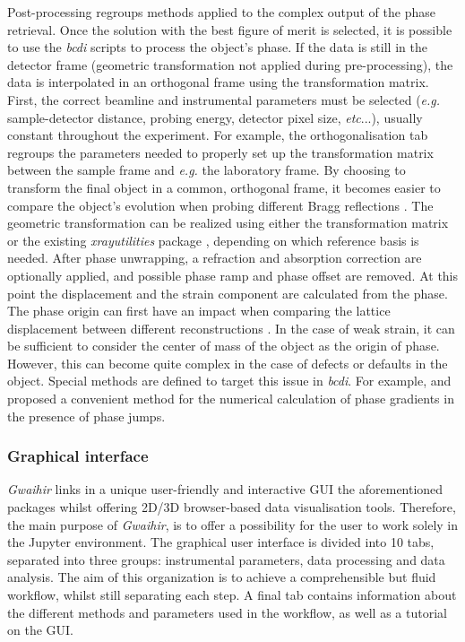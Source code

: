 Post-processing regroups methods applied to the complex output of the phase retrieval.
Once the solution with the best figure of merit is selected, it is possible to use the \textit{bcdi} scripts to process the object's phase.
If the data is still in the detector frame (geometric transformation not applied during pre-processing), the data is interpolated in an orthogonal frame using the transformation matrix.
First, the correct beamline and instrumental parameters must be selected (\textit{e.g.} sample-detector distance, probing energy, detector pixel size, \textit{etc}...), usually constant throughout the experiment.
For example, the orthogonalisation tab regroups the parameters needed to properly set up the transformation matrix between the sample frame and \textit{e.g.} the laboratory frame.
By choosing to transform the final object in a common, orthogonal frame, it becomes easier to compare the object's evolution when probing different Bragg reflections \parencite{crystal_sarah}.
The geometric transformation can be realized using either the transformation matrix \parencite{thesismark} or the existing  \textit{xrayutilities} package \parencite{kriegner_xrayutilities_2013}, depending on which reference basis is needed.
After phase unwrapping, a refraction and absorption correction are optionally applied, and possible phase ramp and phase offset are removed.
At this point the displacement and the strain component are calculated from the phase.
The phase origin can first have an impact when comparing the lattice displacement between different reconstructions \parencite{Atlan2023}.
In the case of weak strain, it can be sufficient to consider the center of mass of the object as the origin of phase.
However, this can become quite complex in the case of defects or defaults in the object.
Special methods are defined to target this issue in \textit{bcdi}.
For example, \cite{guizar-sicairos_phase_2011} and \cite{hofmann_nanoscale_2020} proposed a convenient method for the numerical calculation of phase gradients in the presence of phase jumps.

\subsubsection{Graphical interface}

\textit{Gwaihir} links in a unique user-friendly and interactive GUI the aforementioned packages whilst offering 2D/3D browser-based data visualisation tools.
Therefore, the main purpose of \textit{Gwaihir}, is to offer a possibility for the user to work solely in the Jupyter environment.
The graphical user interface is divided into 10 tabs, separated into three groups: instrumental parameters, data processing and data analysis.
The aim of this organization is to achieve a comprehensible but fluid workflow, whilst still separating each step.
A final tab contains information about the different methods and parameters used in the workflow, as well as a tutorial on the GUI.

